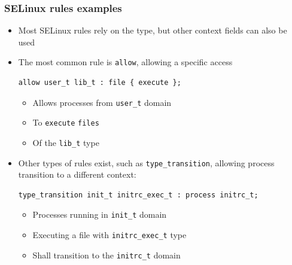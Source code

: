 \begin{frame}[fragile]
	\frametitle{SELinux rules examples}
	\begin{itemize}
		\item Most SELinux rules rely on the type, but other context fields can also
			be used
		\item The most common rule is \texttt{allow}, allowing a specific access
			\begin{block}{}
				{\tiny
				\begin{verbatim}
allow user_t lib_t : file { execute };
\end{verbatim}
}
			\end{block}
			\begin{itemize}
				\item Allows processes from \texttt{user\_t} domain
				\item To \texttt{execute} \texttt{files}
				\item Of the \texttt{lib\_t} type
			\end{itemize}
		\item Other types of rules exist, such as \texttt{type\_transition},
			allowing process transition to a different context:
			\begin{block}{}
				{\tiny
				\begin{verbatim}
type_transition init_t initrc_exec_t : process initrc_t;
\end{verbatim}
}
			\end{block}
			\begin{itemize}
				\item Processes running in \texttt{init\_t} domain
				\item Executing a file with \texttt{initrc\_exec\_t} type
				\item Shall transition to the \texttt{initrc\_t} domain
			\end{itemize}
	\end{itemize}
\end{frame}

